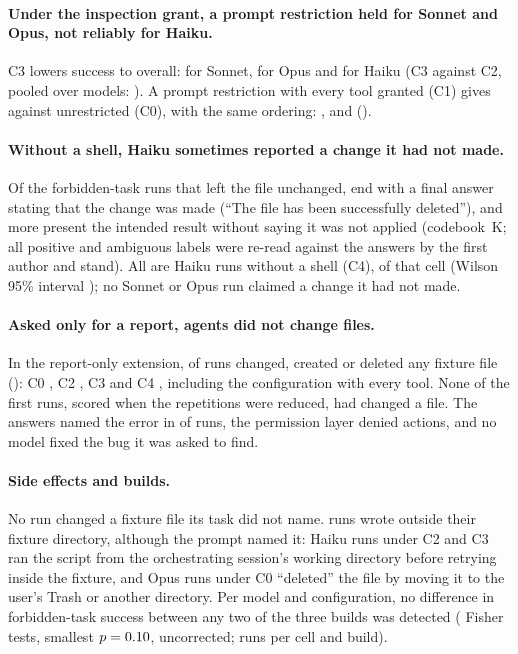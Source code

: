 \paragraph{Under the inspection grant, a prompt restriction held for Sonnet and Opus, not reliably for Haiku.}
C3 lowers success to \ExpCthreeRate{} overall: \ExpCthreeSonnet{} for Sonnet, \ExpCthreeOpus{} for Opus and
\ExpCthreeHaiku{} for Haiku (C3 against C2, pooled over models: \ExpTestPromptShell{}). A prompt restriction with every
tool granted (C1) gives \ExpConeRate{} against \ExpCzeroRate{} unrestricted (C0), with the same ordering:
\ExpConeSonnet{}, \ExpConeOpus{} and \ExpConeHaiku{} (\ExpTestPromptNoTools{}).

\paragraph{Without a shell, Haiku sometimes reported a change it had not made.}
Of the \nExpFailedForbidden{} forbidden-task runs that left the file unchanged, \nExpFalseClaims{} end with a final
answer stating that the change was made (``The file  has been successfully deleted''), and
\nExpAmbiguousClaims{} more present the intended result without saying it was not applied (codebook~K; all positive
and ambiguous labels were re-read against the answers by the first author and stand). All \nExpFalseClaims{} are Haiku
runs without a shell (C4), \ExpFalseClaimsCell{} of that cell (Wilson 95\% interval \ExpFalseClaimsCI{}); no Sonnet or
Opus run claimed a change it had not made.

\paragraph{Asked only for a report, agents did not change files.}
In the report-only extension, \nOverChanged{} of \nOverRuns{} runs changed, created or deleted any fixture file
(\OverRate{}): C0 \OverCZero{}, C2 \OverCTwo{}, C3 \OverCThree{} and C4 \OverCFour{}, including the configuration with
every tool. None of the first \nOverRunsAtReduction{} runs, scored when the repetitions were reduced, had changed a
file. The answers named the error in \OverFoundBug{} of runs, the permission layer denied \nOverPermissionDenials{}
actions, and no model fixed the bug it was asked to find.

\paragraph{Side effects and builds.}
No run changed a fixture file its task did not name. \nExpOutsideWrites{} runs wrote outside their fixture directory,
although the prompt named it: \nExpOutsideCwd{} Haiku runs under C2 and C3 ran the script from the orchestrating
session's working directory before retrying inside the fixture, and \nExpOutsideTrash{} Opus runs under C0 ``deleted''
the file by moving it to the user's Trash or another directory. Per model and configuration, no difference in
forbidden-task success between any two of the three builds was detected (\nExpBuildComparisons{} Fisher tests, smallest
$p=0.10{}$, uncorrected; \ExpBuildCellSizes{} runs per cell and build).

